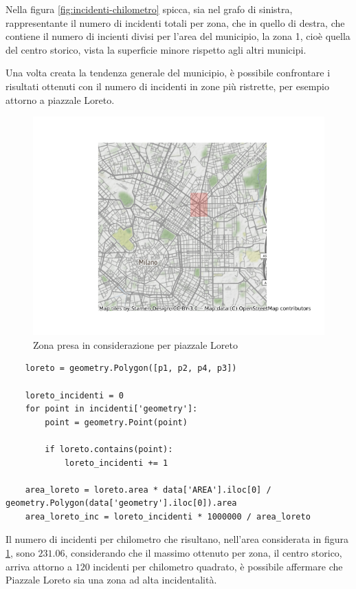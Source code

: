 \documentclass[a4paper,12pt]{report}
\begin{document}
Nella figura \ref{fig:incidenti-chilometro} spicca, sia nel grafo di sinistra, rappresentante 
il numero di incidenti totali per zona, che in 
quello di destra, che contiene il numero di incienti divisi per l'area del municipio, 
la zona 1, cioè quella del centro storico, vista la superficie minore 
rispetto agli altri municipi.

Una volta creata la tendenza generale del municipio, è possibile confrontare i risultati 
ottenuti con il numero di incidenti in zone più ristrette, per esempio attorno a piazzale Loreto.

\begin{figure}
    \hfill\includegraphics[width=0.6\linewidth]{../src/municipi_milano/zona_loreto.png}\hspace*{\fill}
    \caption{Zona presa in considerazione per piazzale Loreto}
    \label{fig:zona-loreto}
\end{figure}

\begin{lstlisting}
    loreto = geometry.Polygon([p1, p2, p4, p3])

    loreto_incidenti = 0
    for point in incidenti['geometry']: 
        point = geometry.Point(point)

        if loreto.contains(point): 
            loreto_incidenti += 1

    area_loreto = loreto.area * data['AREA'].iloc[0] / geometry.Polygon(data['geometry'].iloc[0]).area
    area_loreto_inc = loreto_incidenti * 1000000 / area_loreto
\end{lstlisting}

Il numero di incidenti per chilometro che risultano, nell'area considerata in figura 
\ref{fig:zona-loreto}, sono $231.06$, considerando che il massimo ottenuto per zona, 
il centro storico, arriva attorno a $120$ incidenti per chilometro quadrato, è possibile affermare 
che Piazzale Loreto sia una zona ad alta incidentalità.
\end{document}
